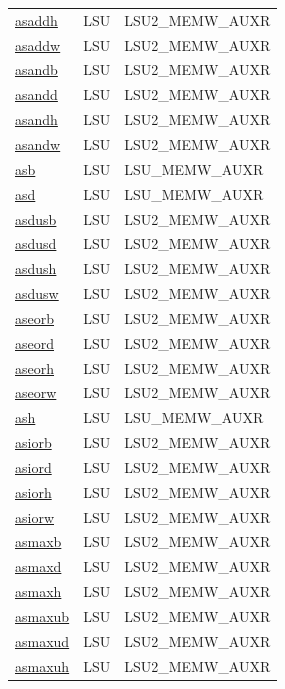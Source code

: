 \begin{small}
\begin{longtable}[l]{l l l}
\hyperlink{lvx.asaddh}{asaddh} & LSU & LSU2\_MEMW\_AUXR \\ 
\hyperlink{lvx.asaddw}{asaddw} & LSU & LSU2\_MEMW\_AUXR \\ 
\hyperlink{lvx.asandb}{asandb} & LSU & LSU2\_MEMW\_AUXR \\ 
\hyperlink{lvx.asandd}{asandd} & LSU & LSU2\_MEMW\_AUXR \\ 
\hyperlink{lvx.asandh}{asandh} & LSU & LSU2\_MEMW\_AUXR \\ 
\hyperlink{lvx.asandw}{asandw} & LSU & LSU2\_MEMW\_AUXR \\ 
\hyperlink{lvx.asb}{asb} & LSU & LSU\_MEMW\_AUXR \\ 
\hyperlink{lvx.asd}{asd} & LSU & LSU\_MEMW\_AUXR \\ 
\hyperlink{lvx.asdusb}{asdusb} & LSU & LSU2\_MEMW\_AUXR \\ 
\hyperlink{lvx.asdusd}{asdusd} & LSU & LSU2\_MEMW\_AUXR \\ 
\hyperlink{lvx.asdush}{asdush} & LSU & LSU2\_MEMW\_AUXR \\ 
\hyperlink{lvx.asdusw}{asdusw} & LSU & LSU2\_MEMW\_AUXR \\ 
\hyperlink{lvx.aseorb}{aseorb} & LSU & LSU2\_MEMW\_AUXR \\ 
\hyperlink{lvx.aseord}{aseord} & LSU & LSU2\_MEMW\_AUXR \\ 
\hyperlink{lvx.aseorh}{aseorh} & LSU & LSU2\_MEMW\_AUXR \\ 
\hyperlink{lvx.aseorw}{aseorw} & LSU & LSU2\_MEMW\_AUXR \\ 
\hyperlink{lvx.ash}{ash} & LSU & LSU\_MEMW\_AUXR \\ 
\hyperlink{lvx.asiorb}{asiorb} & LSU & LSU2\_MEMW\_AUXR \\ 
\hyperlink{lvx.asiord}{asiord} & LSU & LSU2\_MEMW\_AUXR \\ 
\hyperlink{lvx.asiorh}{asiorh} & LSU & LSU2\_MEMW\_AUXR \\ 
\hyperlink{lvx.asiorw}{asiorw} & LSU & LSU2\_MEMW\_AUXR \\ 
\hyperlink{lvx.asmaxb}{asmaxb} & LSU & LSU2\_MEMW\_AUXR \\ 
\hyperlink{lvx.asmaxd}{asmaxd} & LSU & LSU2\_MEMW\_AUXR \\ 
\hyperlink{lvx.asmaxh}{asmaxh} & LSU & LSU2\_MEMW\_AUXR \\ 
\hyperlink{lvx.asmaxub}{asmaxub} & LSU & LSU2\_MEMW\_AUXR \\ 
\hyperlink{lvx.asmaxud}{asmaxud} & LSU & LSU2\_MEMW\_AUXR \\ 
\hyperlink{lvx.asmaxuh}{asmaxuh} & LSU & LSU2\_MEMW\_AUXR \\ 

\end{longtable}
\end{small}
